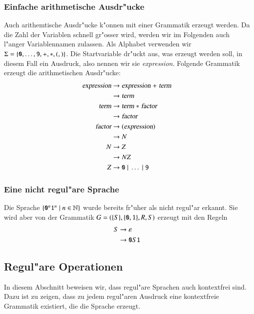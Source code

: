 \subsubsection{Einfache arithmetische Ausdr"ucke}
Auch arithemtische Ausdr"ucke k"onnen mit einer
Grammatik erzeugt werden. Da die Zahl der Variablen schnell gr"osser
wird, werden wir im Folgenden auch l"anger Variablennamen zulassen.
Als Alphabet verwenden wir
$\Sigma=\{{\tt 0},\dots,{\tt 9},{\tt +},{\tt *},{\tt (}, {\tt )}\}$.
Die Startvariable dr"uckt aus, was erzeugt werden soll, in diesem Fall
ein Ausdruck, also nennen wir sie \textsl{expression}.  Folgende Grammatik
erzeugt die arithmetischen Ausdr"ucke:
\begin{align*}
\textsl{expression} &\to \textsl{expression}\;{\tt +}\;\textsl{term}\\
                    &\to \textsl{term}\\
\textsl{term}       &\to \textsl{term}\;{\tt *}\;\textsl{factor}\\
                    &\to \textsl{factor}\\
\textsl{factor}     &\to {\tt (}\textsl{expression}{\tt )}\\
                    &\to N\\
N                   &\to Z\\
                    &\to NZ\\
Z                   &\to {\tt 0}\;|\;\dots \;|\;{\tt 9}
\end{align*}

\subsubsection{Eine nicht regul"are Sprache}
Die Sprache $\{{\tt 0}^n{\tt 1}^n\;|\;n\in\mathbb N\}$ wurde bereits
fr"uher als nicht regul"ar erkannt. Sie wird aber von der 
Grammatik $G=(\{S\}, \{{\tt 0},{\tt 1}\}, R, S)$ erzeugt
mit den Regeln
\begin{align*}
S&\rightarrow \varepsilon\\
&\rightarrow {\tt 0}S{\tt 1}
\end{align*}

\subsection{Regul"are Operationen}
In diesem Abschnitt beweisen wir, dass regul"are Sprachen auch
kontextfrei sind. Dazu ist zu zeigen, dass
zu jedem regul"aren Ausdruck eine kontextfreie Grammatik existiert,
die die Sprache erzeugt.

